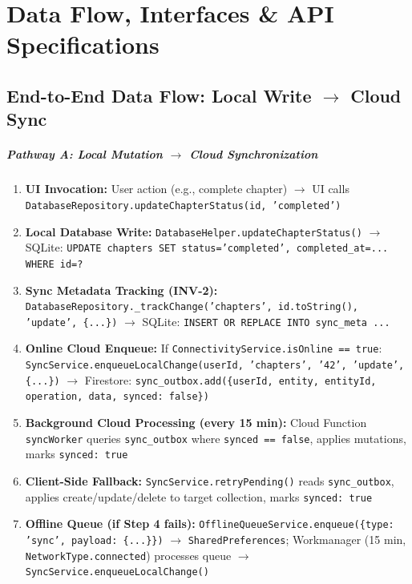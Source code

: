 \documentclass[12pt,a4paper,openany]{report}
\begin{document}
\chapter{Data Flow, Interfaces \& API Specifications}

\section{End-to-End Data Flow: Local Write $\to$ Cloud Sync}

\paragraph{Pathway A: Local Mutation $\to$ Cloud Synchronization}

\begin{enumerate}[leftmargin=*]
  \item \textbf{UI Invocation:} User action (e.g., complete chapter) $\to$ UI calls \texttt{DatabaseRepository.updateChapterStatus(id, 'completed')}
  \item \textbf{Local Database Write:} \texttt{DatabaseHelper.updateChapterStatus()} $\to$ SQLite: \texttt{UPDATE chapters SET status='completed', completed\_at=... WHERE id=?}
  \item \textbf{Sync Metadata Tracking (INV-2):} \texttt{DatabaseRepository.\_trackChange('chapters', id.toString(), 'update', \{...\})} $\to$ SQLite: \texttt{INSERT OR REPLACE INTO sync\_meta ...}
  \item \textbf{Online Cloud Enqueue:} If \texttt{ConnectivityService.isOnline == true}: \texttt{SyncService.enqueueLocalChange(userId, 'chapters', '42', 'update', \{...\})} $\to$ Firestore: \texttt{sync\_outbox.add(\{userId, entity, entityId, operation, data, synced: false\})}
  \item \textbf{Background Cloud Processing (every 15 min):} Cloud Function \texttt{syncWorker} queries \texttt{sync\_outbox} where \texttt{synced == false}, applies mutations, marks \texttt{synced: true}
  \item \textbf{Client-Side Fallback:} \texttt{SyncService.retryPending()} reads \texttt{sync\_outbox}, applies create/update/delete to target collection, marks \texttt{synced: true}
  \item \textbf{Offline Queue (if Step 4 fails):} \texttt{OfflineQueueService.enqueue(\{type: 'sync', payload: \{...\}\})} $\to$ \texttt{SharedPreferences}; Workmanager (15 min, \texttt{NetworkType.connected}) processes queue $\to$ \texttt{SyncService.enqueueLocalChange()}
\end{enumerate}
\end{document}
